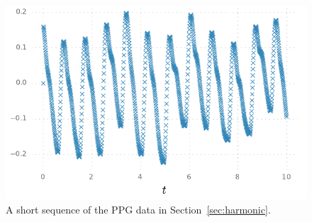  
 \begin{figure}[htbp]%
    \centering%
    \includegraphics{img/harmonic_trajectory}%
	\caption{%
	A short sequence of the PPG data in Section~\ref{sec:harmonic}. %
   	}
	\label{fig:ecg_data}
 \end{figure}
 
